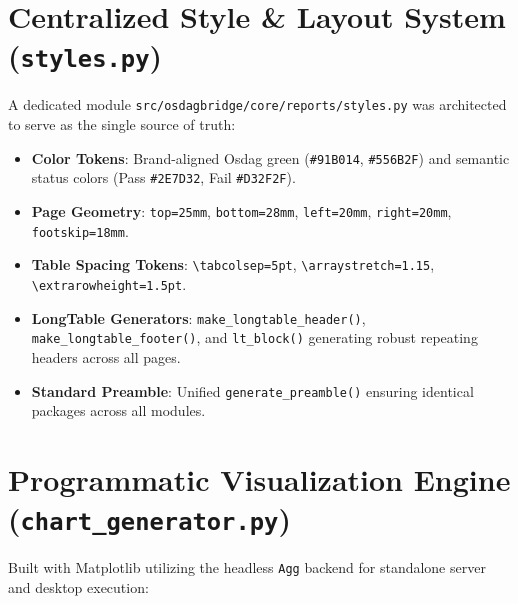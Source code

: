 \documentclass[11pt,a4paper]{article}
\begin{document}
\section{Centralized Style \& Layout System (\texttt{styles.py})}
A dedicated module \texttt{src/osdagbridge/core/reports/styles.py} was architected to serve as the single source of truth:
\begin{itemize}
    \item \textbf{Color Tokens}: Brand-aligned Osdag green (\texttt{\#91B014}, \texttt{\#556B2F}) and semantic status colors (Pass \texttt{\#2E7D32}, Fail \texttt{\#D32F2F}).
    \item \textbf{Page Geometry}: \texttt{top=25mm}, \texttt{bottom=28mm}, \texttt{left=20mm}, \texttt{right=20mm}, \texttt{footskip=18mm}.
    \item \textbf{Table Spacing Tokens}: \texttt{\textbackslash tabcolsep=5pt}, \texttt{\textbackslash arraystretch=1.15}, \texttt{\textbackslash extrarowheight=1.5pt}.
    \item \textbf{LongTable Generators}: \texttt{make\_longtable\_header()}, \texttt{make\_longtable\_footer()}, and \texttt{lt\_block()} generating robust repeating headers across all pages.
    \item \textbf{Standard Preamble}: Unified \texttt{generate\_preamble()} ensuring identical packages across all modules.
\end{itemize}

\section{Programmatic Visualization Engine (\texttt{chart_generator.py})}
Built with Matplotlib utilizing the headless \texttt{Agg} backend for standalone server and desktop execution:
\end{document}
